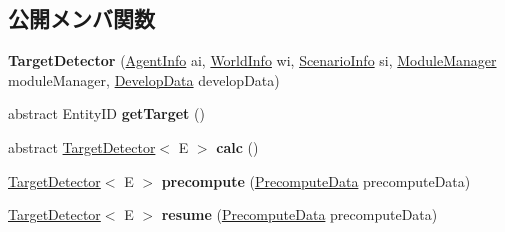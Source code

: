 \subsection*{公開メンバ関数}
\begin{DoxyCompactItemize}
\item 
\hypertarget{classadf_1_1component_1_1module_1_1complex_1_1TargetDetector_aa85f9c037c852a920c96359ff9a7d870}{}\label{classadf_1_1component_1_1module_1_1complex_1_1TargetDetector_aa85f9c037c852a920c96359ff9a7d870} 
{\bfseries Target\+Detector} (\hyperlink{classadf_1_1agent_1_1info_1_1AgentInfo}{Agent\+Info} ai, \hyperlink{classadf_1_1agent_1_1info_1_1WorldInfo}{World\+Info} wi, \hyperlink{classadf_1_1agent_1_1info_1_1ScenarioInfo}{Scenario\+Info} si, \hyperlink{classadf_1_1agent_1_1module_1_1ModuleManager}{Module\+Manager} module\+Manager, \hyperlink{classadf_1_1agent_1_1develop_1_1DevelopData}{Develop\+Data} develop\+Data)
\item 
\hypertarget{classadf_1_1component_1_1module_1_1complex_1_1TargetDetector_a98b71b2e4c4e1107ac43a1d644dc4de8}{}\label{classadf_1_1component_1_1module_1_1complex_1_1TargetDetector_a98b71b2e4c4e1107ac43a1d644dc4de8} 
abstract Entity\+ID {\bfseries get\+Target} ()
\item 
\hypertarget{classadf_1_1component_1_1module_1_1complex_1_1TargetDetector_a6c809f961782b7ee5a56713d72e41776}{}\label{classadf_1_1component_1_1module_1_1complex_1_1TargetDetector_a6c809f961782b7ee5a56713d72e41776} 
abstract \hyperlink{classadf_1_1component_1_1module_1_1complex_1_1TargetDetector}{Target\+Detector}$<$ E $>$ {\bfseries calc} ()
\item 
\hypertarget{classadf_1_1component_1_1module_1_1complex_1_1TargetDetector_ad8620d626ba9f80585139df86e88c2b5}{}\label{classadf_1_1component_1_1module_1_1complex_1_1TargetDetector_ad8620d626ba9f80585139df86e88c2b5} 
\hyperlink{classadf_1_1component_1_1module_1_1complex_1_1TargetDetector}{Target\+Detector}$<$ E $>$ {\bfseries precompute} (\hyperlink{classadf_1_1agent_1_1precompute_1_1PrecomputeData}{Precompute\+Data} precompute\+Data)
\item 
\hypertarget{classadf_1_1component_1_1module_1_1complex_1_1TargetDetector_aca939c087c98e7b3d8a107633af0b095}{}\label{classadf_1_1component_1_1module_1_1complex_1_1TargetDetector_aca939c087c98e7b3d8a107633af0b095} 
\hyperlink{classadf_1_1component_1_1module_1_1complex_1_1TargetDetector}{Target\+Detector}$<$ E $>$ {\bfseries resume} (\hyperlink{classadf_1_1agent_1_1precompute_1_1PrecomputeData}{Precompute\+Data} precompute\+Data)
\item 

\end{DoxyCompactItemize}
